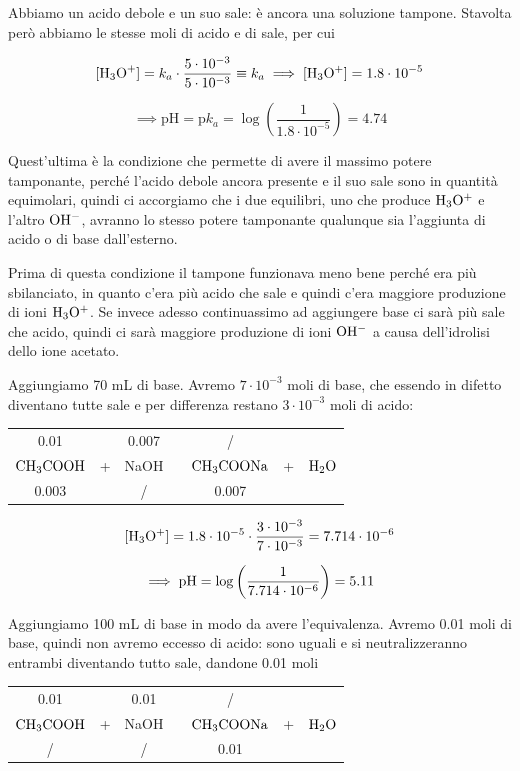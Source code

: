 Abbiamo un acido debole e un suo sale: è ancora una soluzione tampone. Stavolta però abbiamo le stesse moli di acido e di sale, per cui

$$[\text{H}_3\text{O}^+]=k_a \cdot \frac{5 \cdot 10^{-3}}{5 \cdot 10^{-3}} \equiv k_a \implies \rm [H_3O^+]=1.8 \cdot 10^{-5}$$

$$\implies \text{pH}=\text{p}k_a=\log{\left(\frac{1}{1.8 \cdot 10^{-5}}\right)}=4.74$$

Quest'ultima è la condizione che permette di avere il massimo potere tamponante, perché l'acido debole ancora presente e il suo sale sono in quantità equimolari, quindi ci accorgiamo che i due equilibri, uno che produce $\rm H_3O^+$ e l'altro $\rm OH^-$, avranno lo stesso potere tamponante qualunque sia l'aggiunta di acido o di base dall'esterno.

Prima di questa condizione il tampone funzionava meno bene perché era più sbilanciato, in quanto c'era più acido che sale e quindi c'era maggiore produzione di ioni $\rm H_3O^+$. Se invece adesso continuassimo ad aggiungere base ci sarà più sale che acido, quindi ci sarà maggiore produzione di ioni $\rm OH^-$ a causa dell'idrolisi dello ione acetato.

Aggiungiamo 70 mL di base. Avremo $7 \cdot 10^{-3}$ moli di base, che essendo in difetto diventano tutte sale e per differenza restano $3 \cdot 10^{-3}$ moli di acido:

\begin{center}
    \begin{tabular}{ccccccc}
        0.01 &  & 0.007  & & / & &\\
        $\rm CH_3COOH$ & + & NaOH & \ce{->} & $\rm CH_3COONa$ & + & $\rm H_2O$\\
        0.003 &  &  / & & 0.007 & &\\
    \end{tabular}
\end{center}

$$\rm [H_3O^+]=1.8 \cdot 10^{-5} \cdot \frac{3 \cdot 10^{-3}}{7 \cdot 10^{-3}}=7.714 \cdot 10^{-6}$$

$$\implies \rm pH=\log{\left(\frac{1}{7.714 \cdot 10^{-6}}\right)}=5.11$$

Aggiungiamo 100 mL di base in modo da avere l'equivalenza. Avremo 0.01 moli di base, quindi non avremo eccesso di acido: sono uguali e si neutralizzeranno entrambi diventando tutto sale, dandone 0.01 moli

\begin{center}
    \begin{tabular}{ccccccc}
        0.01 &  & 0.01  & & / & &\\
        $\rm CH_3COOH$ & + & NaOH & \ce{->} & $\rm CH_3COONa$ & + & $\rm H_2O$\\
        / &  &  / & & 0.01 & &\\
    \end{tabular}
\end{center}


